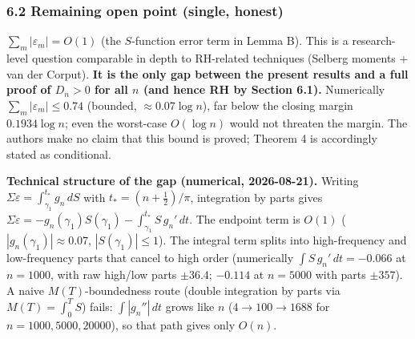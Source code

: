 \documentclass[
]{article}
\begin{document}
\hypertarget{remaining-open-point-single-honest}{%
\subsubsection{6.2 Remaining open point (single,
honest)}\label{remaining-open-point-single-honest}}

\(\sum_m|\varepsilon_m| = O(1)\) (the \(S\)-function error term in Lemma
B). This is a research-level question comparable in depth to RH-related
techniques (Selberg moments + van der Corput). \textbf{It is the only
gap between the present results and a full proof of \(D_n>0\) for all
\(n\) (and hence RH by Section 6.1).} Numerically
\(\sum_m|\varepsilon_m| \le 0.74\) (bounded, \(\approx 0.07\log n\)),
far below the closing margin \(0.1934\log n\); even the worst-case
\(O(\log n)\) would not threaten the margin. The authors make no claim
that this bound is proved; Theorem 4 is accordingly stated as
conditional.

\textbf{Technical structure of the gap (numerical, 2026-08-21).} Writing
\(\Sigma\varepsilon = \int_{\gamma_1}^{t_*} g_n\,dS\) with
\(t_*=(n+\tfrac12)/\pi\), integration by parts gives
\(\Sigma\varepsilon = -g_n(\gamma_1)S(\gamma_1) - \int_{\gamma_1}^{t_*} S\,g_n'\,dt\).
The endpoint term is \(O(1)\) (\(|g_n(\gamma_1)| \approx 0.07\),
\(|S(\gamma_1)| \le 1\)). The integral term splits into high-frequency
and low-frequency parts that cancel to high order (numerically
\(\int S\,g_n'\,dt = -0.066\) at \(n=1000\), with raw high/low parts
\(\pm 36.4\); \(-0.114\) at \(n=5000\) with parts \(\pm 357\)). A naive
\(M(T)\)-boundedness route (double integration by parts via
\(M(T)=\int_0^T S\)) fails: \(\int|g_n''|\,dt\) grows like \(n\)
(\(4 \to 100 \to 1688\) for \(n=1000,5000,20000\)), so that path gives
only \(O(n)\).
\end{document}
